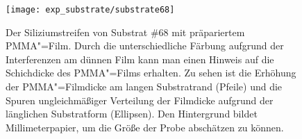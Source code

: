 \begin{figure}[htp!]
	\texttt{[image: exp\_substrate/substrate68]}%
	\hskip -1.5cm%
	\begin{minipage}[b]{0.4\linewidth+1.5cm}
		\caption[Photo des PMMA/Si"=Substrats \#68]{Der Siliziumstreifen von Substrat \#68 mit präpariertem PMMA"=Film. Durch die unterschiedliche Färbung aufgrund der Interferenzen am dünnen Film kann man einen Hinweis auf die Schichdicke des PMMA"=Films erhalten. Zu sehen ist die Erhöhung der PMMA"=Filmdicke am langen Substratrand (Pfeile) und die Spuren ungleichmäßiger Verteilung der Filmdicke aufgrund der länglichen Substratform (Ellipsen). Den Hintergrund bildet Millimeterpapier, um die Größe der Probe abschätzen zu können.}
		\label{fig:substrat_pmma}
	\end{minipage}
\end{figure}

